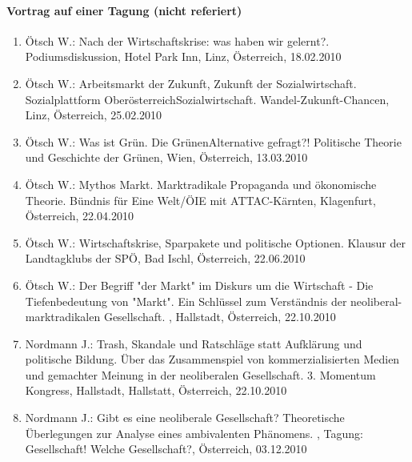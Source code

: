 \paragraph{Vortrag auf einer Tagung (nicht referiert)}
\begin{enumerate}
	\item Ötsch W.: Nach der Wirtschaftskrise: was haben wir gelernt?. Podiumsdiskussion, Hotel Park Inn, Linz, Österreich, 18.02.2010
	\item Ötsch W.: Arbeitsmarkt der Zukunft, Zukunft der Sozialwirtschaft. Sozialplattform OberösterreichSozialwirtschaft. Wandel-Zukunft-Chancen, Linz, Österreich, 25.02.2010
	\item Ötsch W.: Was ist Grün. Die GrünenAlternative gefragt?! Politische Theorie und Geschichte der Grünen, Wien, Österreich, 13.03.2010
	\item Ötsch W.: Mythos Markt. Marktradikale Propaganda und ökonomische Theorie. Bündnis für Eine Welt/ÖIE mit ATTAC-Kärnten, Klagenfurt, Österreich, 22.04.2010
	\item Ötsch W.: Wirtschaftskrise, Sparpakete und politische Optionen. Klausur der Landtagklubs der SPÖ, Bad Ischl, Österreich, 22.06.2010
	\item Ötsch W.: Der Begriff "der Markt" im Diskurs um die Wirtschaft - Die Tiefenbedeutung von "Markt". Ein Schlüssel zum Verständnis der neoliberal-marktradikalen Gesellschaft. , Hallstadt, Österreich, 22.10.2010
	\item Nordmann J.: Trash, Skandale und Ratschläge statt Aufklärung und politische Bildung. Über das Zusammenspiel von kommerzialisierten Medien und gemachter Meinung in der neoliberalen Gesellschaft. 3. Momentum Kongress, Hallstadt, Hallstatt, Österreich, 22.10.2010
	\item Nordmann J.: Gibt es eine neoliberale Gesellschaft? Theoretische Überlegungen zur Analyse eines ambivalenten Phänomens. , Tagung: Gesellschaft! Welche Gesellschaft?, Österreich, 03.12.2010
\end{enumerate}
